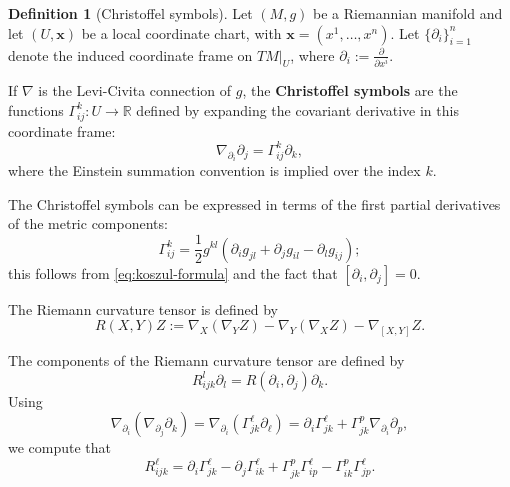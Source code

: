 \documentclass[11pt]{article}
\theoremstyle{plain}
\theoremstyle{definition}
\newtheorem{definition}[theorem]{Definition}
\theoremstyle{remark}
\begin{document}
\begin{definition}[Christoffel symbols]
\label{def:Christoffel_symbols}
    Let $(M,g)$ be a Riemannian manifold and let $(U,\mathbf{x})$ be a
    local coordinate chart, with $\mathbf{x}=(x^1,\dots,x^n)$.  Let
    $\{\partial_i\}_{i=1}^n$ denote the induced coordinate frame on
    $TM|_U$, where $\partial_i:=\frac{\partial}{\partial x^i}$.

    If $\nabla$ is the Levi-Civita connection of $g$, the
    \textbf{Christoffel symbols} are the functions
    $\Gamma_{ij}^k:U\to\mathbb R$ defined by expanding the covariant
    derivative in this coordinate frame:
    \begin{equation}
        \nabla_{\partial_i} \partial_j = \Gamma_{ij}^k \partial_k,
    \end{equation}
    where the Einstein summation convention is implied over the index $k$.
\end{definition}

The Christoffel symbols can be expressed in terms of the first partial
derivatives of the metric components:
\begin{equation}\label{eq:ChristoffelSymbols0th}
        \Gamma_{ij}^k = \frac{1}{2} g^{kl} \left( \partial_i g_{jl} + \partial_j g_{il} - \partial_l g_{ij} \right) ;
    \end{equation}
this follows from \eqref{eq:koszul-formula} and the fact that $[\partial_i,\partial_j]=0$.

The Riemann curvature tensor is defined by
\begin{equation}\label{eq:riemann-curvature-definition}
   R(X,Y)Z := \nabla_X (\nabla_Y Z) - \nabla_Y (\nabla_X Z) - \nabla_{[X,Y]} Z .
\end{equation}

The components of the Riemann curvature tensor are defined by
\begin{equation}
    R_{ijk}^l \partial_l = R(\partial_i,\partial_j)\partial_k .
\end{equation}
Using
\begin{equation*}
    \nabla_{\partial_i}(\nabla_{\partial_j}\partial_k) = \nabla_{\partial_i}(\Gamma_{jk}^\ell \partial_\ell)
    = \partial_i \Gamma_{jk}^{\ell}
+ \Gamma_{jk}^p \nabla_{\partial_i}\partial_p ,
\end{equation*}
we compute that
    \begin{equation}\label{eq:riemann-curvature-components}
        R_{ijk}^{\ell} = \partial_i \Gamma_{jk}^{\ell} - \partial_j \Gamma_{ik}^{\ell} + \Gamma_{jk}^{p}\Gamma_{ip}^{\ell} - \Gamma_{ik}^{p}\Gamma_{jp}^{\ell}.
    \end{equation}
\end{document}
